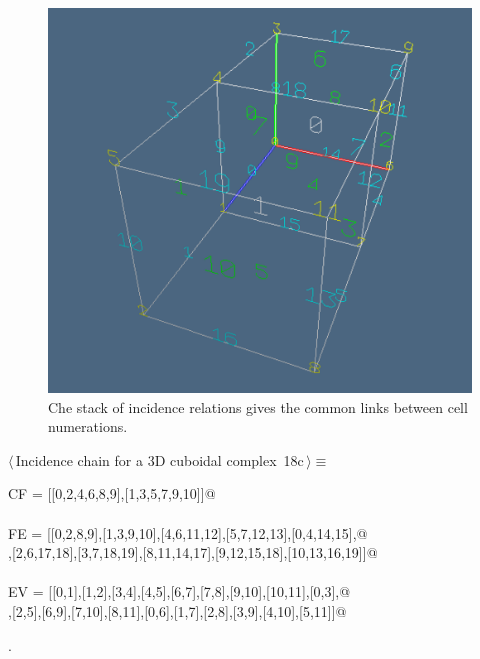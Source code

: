 \documentclass[11pt,oneside]{article}	%
\begin{document}
\begin{figure}[htbp] %
   \centering
   \includegraphics[width=0.5\linewidth]{images/incidenceChain} 
   \caption{Che stack of incidence relations gives the common links between cell numerations.}
   \label{incidenceChain}
\end{figure}


\begin{flushleft} \small \label{scrap33}
\protect{}$\langle\,$Incidence chain for a 3D cuboidal complex\nobreak\ {\footnotesize 18c}$\,\rangle\equiv$
\vspace{-1ex}
\begin{list}{}{} \item
\mbox{}\verb@incidence CF = [[0,2,4,6,8,9],[1,3,5,7,9,10]]@\\
\mbox{}\verb@@\\
\mbox{}\verb@incidence FE = [[0,2,8,9],[1,3,9,10],[4,6,11,12],[5,7,12,13],[0,4,14,15],@\\
\mbox{}\verb@[1,5,15,16],[2,6,17,18],[3,7,18,19],[8,11,14,17],[9,12,15,18],[10,13,16,19]]@\\
\mbox{}\verb@@\\
\mbox{}\verb@incidence EV = [[0,1],[1,2],[3,4],[4,5],[6,7],[7,8],[9,10],[10,11],[0,3],@\\
\mbox{}\verb@[1,4],[2,5],[6,9],[7,10],[8,11],[0,6],[1,7],[2,8],[3,9],[4,10],[5,11]]@\\
\mbox{}\verb@@{\NWsep}
\end{list}
\vspace{-1ex}
\footnotesize\addtolength{\baselineskip}{-1ex}
\begin{list}{}{\setlength{\itemsep}{-\parsep}\setlength{\itemindent}{-\leftmargin}}
\item {\NWtxtMacroNoRef}.
\end{list}
\end{flushleft}
\end{document}
